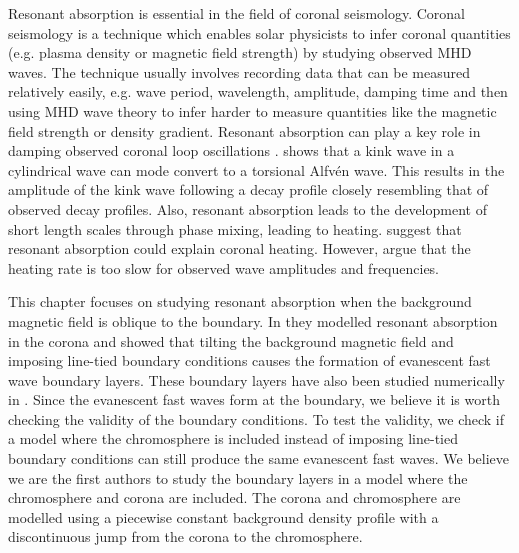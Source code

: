 Resonant absorption is essential in the field of coronal seismology. Coronal seismology is a technique which enables solar physicists to infer coronal quantities (e.g. plasma density or magnetic field strength) by studying observed MHD waves. The technique usually involves recording data that can be measured relatively easily, e.g. wave period, wavelength, amplitude, damping time and then using MHD wave theory to infer harder to measure quantities like the magnetic field strength or density gradient. Resonant absorption can play a key role in damping observed coronal loop oscillations \citep{Nakariakov1999, Terradas2006}. \citet{Ruderman2002} shows that a kink wave in a cylindrical wave can mode convert to a torsional Alfv\'en wave. This results in the amplitude of the kink wave following a decay profile closely resembling that of observed decay profiles. Also, resonant absorption leads to the development of short length scales through phase mixing, leading to heating. \citet{Poedts1989,Ofman1995} suggest that resonant absorption could explain coronal heating. However, \citet{Prokopyszyn2019b} argue that the heating rate is too slow for observed wave amplitudes and frequencies.

This chapter focuses on studying resonant absorption when the background magnetic field is oblique to the boundary. In \citet{Halberstadt1993,Halberstadt1995} they modelled resonant absorption in the corona and showed that tilting the background magnetic field and imposing line-tied boundary conditions causes the formation of evanescent fast wave boundary layers. These boundary layers have also been studied numerically in \citet{Arregui2003}. Since the evanescent fast waves form at the boundary, we believe it is worth checking the validity of the boundary conditions. To test the validity, we check if a model where the chromosphere is included instead of imposing line-tied boundary conditions can still produce the same evanescent fast waves. We believe we are the first authors to study the boundary layers in a model where the chromosphere and corona are included. The corona and chromosphere are modelled using a piecewise constant background density profile with a discontinuous jump from the corona to the chromosphere.

